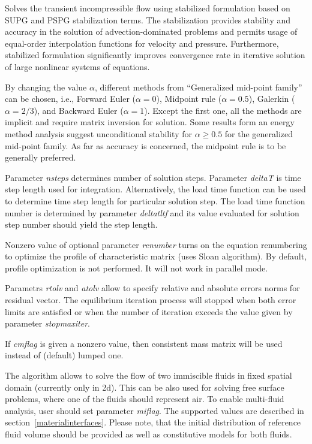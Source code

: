 \documentclass[a4paper]{article}
\newcommand{\param}[1]{{\em #1}}
\begin{document}
Solves the transient incompressible flow using stabilized formulation
based on SUPG and PSPG
stabilization terms. The stabilization provides
stability and accuracy in the solution of
advection-dominated problems and permits usage of equal-order
interpolation functions for velocity and pressure. Furthermore,
stabilized formulation significantly improves convergence rate in
iterative solution of large nonlinear systems of equations.

By changing the value $\alpha$, different methods from
``Generalized mid-point family'' can be chosen, i.e.,
Forward Euler ($\alpha=0$), Midpoint rule ($\alpha=0.5$),
 Galerkin ($\alpha=2/3$), and  Backward Euler ($\alpha=1$). Except
the first one, all the methods are implicit and require matrix inversion for solution.
Some results form an energy method analysis suggest unconditional
stability for $\alpha\ge 0.5$ for the generalized mid-point family. As
far as accuracy is concerned, the midpoint rule is to be generally preferred.

Parameter \param{nsteps} determines number of solution
steps. Parameter \param{deltaT} is time step length used for
integration. Alternatively, the load time function can be used to
determine time step length for particular solution step. The load time
function number is determined by parameter \param{deltatltf} and its
value evaluated for solution step number should yield the step length.

Nonzero value of optional parameter \param{renumber} turns on the
equation renumbering to optimize the profile of characteristic matrix
(uses Sloan algorithm). By default, profile optimization is not
performed. It will not work in parallel mode.

Parametrs \param{rtolv} and \param{atolv} allow to
specify relative and absolute errors norms for residual vector.
The equilibrium iteration process will stopped when both error limits
are satisfied or when the number of iteration exceeds the value given
by parameter \param{stopmaxiter}.

If \param{cmflag} is given a nonzero value, then
consistent mass matrix will be used instead of (default) lumped one.

The algorithm allows to solve the flow of two immiscible fluids in
fixed spatial domain (currently only in 2d). This can be also used for
solving free surface problems, where one of the fluids should
represent air. To enable multi-fluid analysis, user should set parameter \param{miflag}. The supported values are described in section~\ref{materialinterfaces}.
Please note, that the initial distribution of reference fluid
volume should be provided as well as
constitutive models for both fluids.
\end{document}
